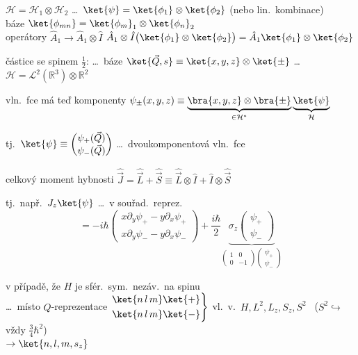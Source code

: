  \quad $\mathcal{H} = \mathcal{H}_1\otimes\mathcal{H}_2$ \quad
\dots\ $\ket{\psi} = \ket{\phi_1}\otimes\ket{\phi_2}$ (nebo lin.\ kombinace) \\
\hspace*{6cm} báze $\ket{\phi_{mn}} = \ket{\phi_m}_1\otimes\ket{\phi_n}_2$ \\
\quad operátory \quad $\hat A_1 \to \hat A_1\otimes\hat I$ \qquad
$\hat A_1\otimes\hat I\big(\ket{\phi_1}\otimes\ket{\phi_2}\big) = \hat A_1\ket{\phi_1}\otimes\ket{\phi_2}$

částice se spinem $\frac12$: \dots\ báze $\ket{\vec Q,s} \equiv \ket{x,y,z}\otimes\ket{\pm}$ \quad \dots\ $\mathcal{H} = \mathcal{L}^2(\mathbb{R}^3)\otimes\mathbb{R}^2$

\quad vln.\ fce má teď komponenty \quad
$\psi_\pm(x,y,z) \equiv \underbrace{\bra{x,y,z}\otimes\bra{\pm}}_{\in\mathcal{H}^*}\underbrace{\ket{\psi}}_{\mathcal{H}}$

\quad tj.\ $\ket{\psi} \equiv \begin{pmatrix}\psi_+(\vec Q)\\ \psi_-(\vec Q)\end{pmatrix}$ \quad \dots\ dvoukomponentová vln.\ fce

celkový moment hybnosti \quad $\hat{\vec J} = \hat{\vec L} + \hat{\vec S} \equiv \hat{\vec L}\otimes\hat I + \hat I\otimes\hat{\vec S}$

tj.\ např.\ $J_z\ket{\psi}$ \dots\ v souřad.\ reprez.\
\[
  = -i\hbar\begin{pmatrix} x\partial_y\psi_+ - y\partial_x\psi_+ \\ x\partial_y\psi_- - y\partial_x\psi_-\end{pmatrix}
  + \frac{i\hbar}{2}\underbrace{\sigma_z\begin{pmatrix}\psi_+\\ \psi_-\end{pmatrix}}_{\begin{pmatrix}1&0\\0&-1\end{pmatrix}\begin{pmatrix}\psi_+\\ \psi_-\end{pmatrix}}
\]

v případě, že $H$ je sfér.\ sym.\ nezáv.\ na spinu \\
\dots\ místo $Q$-reprezentace \quad
$\left.\begin{aligned} &\ket{n\,l\,m}\ket{+} \\ &\ket{n\,l\,m}\ket{-}\end{aligned}\right\}$
vl.\ v.\ $H, L^2, L_z, S_z, S^2$ \ ($S^2 \hookrightarrow$ vždy $\frac34\hbar^2$) \\
\hspace*{5.8cm} $\to \ket{n,l,m,s_z}$


